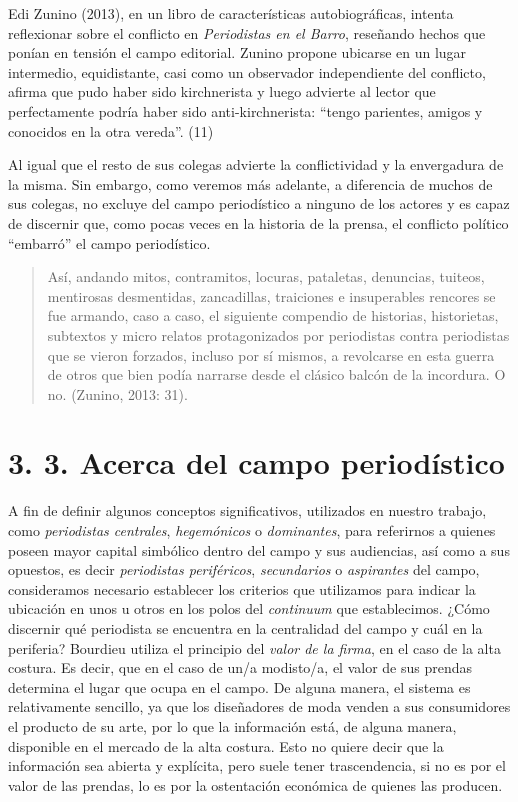 {Edi Zunino (2013), en un libro de características autobiográficas, intenta reflexionar sobre el conflicto en \emph{Periodistas en el Barro}, reseñando hechos que ponían en tensión el campo editorial. Zunino propone ubicarse en un lugar intermedio, equidistante, casi como un observador independiente del conflicto, afirma que pudo haber sido kirchnerista y luego advierte al lector que perfectamente podría haber sido anti-kirchnerista: \enquote{tengo parientes, amigos y conocidos en la otra vereda}. (11)

Al igual que el resto de sus colegas advierte la conflictividad y la envergadura de la misma. Sin embargo, como veremos más adelante, a diferencia de muchos de sus colegas, no excluye del campo periodístico a ninguno de los actores y es capaz de discernir que, como pocas veces en la historia de la prensa, el conflicto político \enquote{embarró} el campo periodístico.

\begin{quote}
Así, andando mitos, contramitos, locuras, pataletas, denuncias, tuiteos, mentirosas desmentidas, zancadillas, traiciones e insuperables rencores se fue armando, caso a caso, el siguiente compendio de historias, historietas, subtextos y micro relatos protagonizados por periodistas contra periodistas que se vieron forzados, incluso por sí mismos, a revolcarse en esta guerra de otros que bien podía narrarse desde el clásico balcón de la incordura. O no. (Zunino, 2013: 31).
\end{quote}

\section{3. 3. Acerca del campo periodístico}

A fin de definir algunos conceptos significativos, utilizados en nuestro trabajo, como \emph{periodistas centrales}, \emph{hegemónicos} o \emph{dominantes}, para referirnos a quienes poseen mayor capital simbólico dentro del campo y sus audiencias, así como a sus opuestos, es decir \emph{periodistas periféricos}, \emph{secundarios} o \emph{aspirantes} del campo, consideramos necesario establecer los criterios que utilizamos para indicar la ubicación en unos u otros en los polos del \emph{continuum} que establecimos. ¿Cómo discernir qué periodista se encuentra en la centralidad del campo y cuál en la periferia? Bourdieu utiliza el principio del \emph{valor de la firma}, en el caso de la alta costura. Es decir, que en el caso de un/a modisto/a, el valor de sus prendas determina el lugar que ocupa en el campo. De alguna manera, el sistema es relativamente sencillo, ya que los diseñadores de moda venden a sus consumidores el producto de su arte, por lo que la información está, de alguna manera, disponible en el mercado de la alta costura. Esto no quiere decir que la información sea abierta y explícita, pero suele tener trascendencia, si no es por el valor de las prendas, lo es por la ostentación económica de quienes las producen.

}

